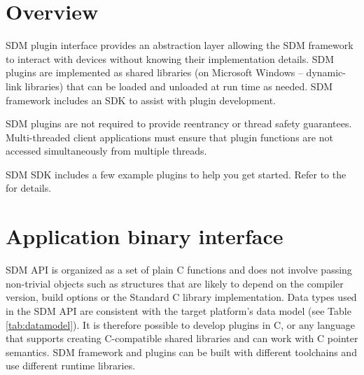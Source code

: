 \documentclass[a4paper,12pt,twoside,extrafontsizes]{memoir}
\begin{document}
\section{Overview}

SDM plugin interface provides an abstraction layer allowing the SDM framework to interact with devices without knowing their implementation details. SDM plugins are implemented as shared libraries (on Microsoft Windows -- dynamic-link libraries) that can be loaded and unloaded at run time as needed. SDM framework includes an SDK to assist with plugin development.

SDM plugins are not required to provide reentrancy or thread safety guarantees. Multi-threaded client applications must ensure that plugin functions are not accessed simultaneously from multiple threads.

SDM SDK includes a few example plugins to help you get started. Refer to the  for details.

\section{Application binary interface}
\label{sec:abi}

SDM API is organized as a set of plain C functions and does not involve passing non-trivial objects such as structures that are likely to depend on the compiler version, build options or the Standard C library implementation. Data types used in the SDM API are consistent with the target platform's data model (see Table \ref{tab:datamodel}). It is therefore possible to develop plugins in C, \cplusplus{} or any language that supports creating C-compatible shared libraries and can work with C pointer semantics. SDM framework and plugins can be built with different toolchains and use different runtime libraries.
\end{document}
